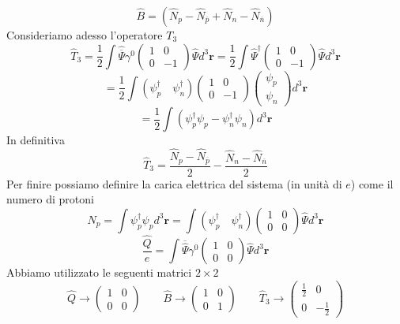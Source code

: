 $$
\widehat{B} = (\widehat{N}_p - \widehat{N}_{\overline{p}} + \widehat{N}_n - \widehat{N}_{\overline{n}})
$$
Consideriamo adesso l'operatore $T_3$
$$
\widehat{T}_3 = \frac{1}{2} \int \widehat{\overline{\Psi}} \gamma^0 \begin{pmatrix} 1 & 0 \\ 0 & -1 \end{pmatrix} \widehat{\Psi} d^3\mathbf{r} = \frac{1}{2} \int \widehat{\Psi}^\dagger \begin{pmatrix} 1 & 0 \\ 0 & -1 \end{pmatrix} \widehat{\Psi} d^3\mathbf{r}
$$
$$
= \frac{1}{2} \int (\psi_p^\dagger \quad \psi_n^\dagger) \begin{pmatrix} 1 & 0 \\ 0 & -1 \end{pmatrix} \begin{pmatrix} \psi_p \\ \psi_n \end{pmatrix} d^3\mathbf{r}
$$
$$
= \frac{1}{2} \int (\psi_p^\dagger \psi_p - \psi_n^\dagger \psi_n) d^3\mathbf{r}
$$
In definitiva
$$
\widehat{T}_3 = \frac{\widehat{N}_p - \widehat{N}_{\overline{p}}}{2} - \frac{\widehat{N}_n - \widehat{N}_{\overline{n}}}{2}
$$
Per finire possiamo definire la carica elettrica del sistema (in unità di $e$) come il numero di protoni
$$
N_p = \int \psi_p^\dagger \psi_p d^3\mathbf{r} = \int \left( \psi_p^\dagger \quad \psi_n^\dagger \right) \begin{pmatrix} 1 & 0 \\ 0 & 0 \end{pmatrix} \widehat{\Psi} d^3\mathbf{r}
$$
$$
\frac{\widehat{Q}}{e} = \int \overline{\widehat{\Psi}} \gamma^0 \begin{pmatrix} 1 & 0 \\ 0 & 0 \end{pmatrix} \widehat{\Psi} d^3\mathbf{r}
$$
Abbiamo utilizzato le seguenti matrici $2\times 2$
$$
\widehat{Q} \to \begin{pmatrix} 1 & 0 \\ 0 & 0 \end{pmatrix} \quad \quad \widehat{B} \to \begin{pmatrix} 1 & 0 \\ 0 & 1 \end{pmatrix} \quad \quad \widehat{T}_3 \to \begin{pmatrix} \frac{1}{2} & 0 \\ 0 & -\frac{1}{2} \end{pmatrix}
$$

